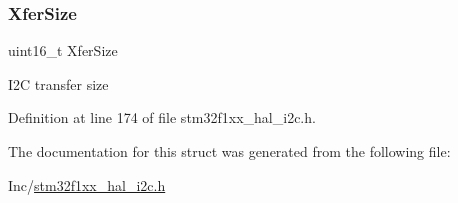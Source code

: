 \mbox{\label{struct_i2_c___handle_type_def_a51999331ab800faccdb97383b39819dd}} 
\subsubsection{\texorpdfstring{Xfer\+Size}{XferSize}}
{\footnotesize\ttfamily uint16\+\_\+t Xfer\+Size}

I2C transfer size 

Definition at line 174 of file stm32f1xx\+\_\+hal\+\_\+i2c.\+h.



The documentation for this struct was generated from the following file\+:\begin{DoxyCompactItemize}
\item 
Inc/\hyperlink{stm32f1xx__hal__i2c_8h}{stm32f1xx\+\_\+hal\+\_\+i2c.\+h}\end{DoxyCompactItemize}
